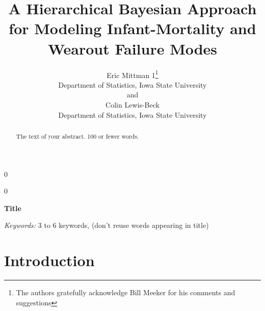 \documentclass[12pt]{article}
\newcommand{\blind}{0}
\begin{document}
%

\def\spacingset#1{\renewcommand{\baselinestretch}%
{#1}\small\normalsize} \spacingset{1}



\blind
{
  \title{\bf A Hierarchical Bayesian Approach for Modeling Infant-Mortality and Wearout Failure Modes}
  \author{Eric Mittman 1\thanks{
    The authors gratefully acknowledge Bill Meeker for his comments and suggestions}\hspace{.2cm}\\
    Department of Statistics, Iowa State University\\
    and \\
    Colin Lewis-Beck \\
    Department of Statistics, Iowa State University}
  \maketitle
} \fi

\blind
{
  \bigskip
  \bigskip
  \bigskip
  \begin{center}
    {\LARGE\bf Title}
\end{center}
  \medskip
} \fi

\bigskip
\begin{abstract}
The text of your abstract.  100 or fewer words.
\end{abstract}

\noindent%
{\it Keywords:}  3 to 6 keywords, (don't reuse words appearing in title)
\vfill

\newpage
\spacingset{1.45} %
\section{Introduction}
\end{document}
